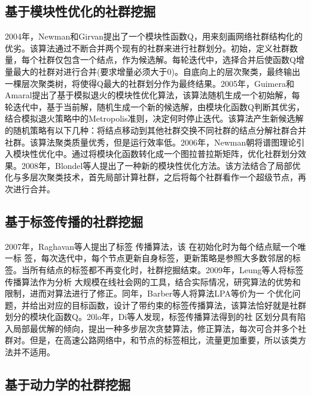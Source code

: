 	\subsection{基于模块性优化的社群挖掘}
		2004年，Newman和Girvan提出了一个模块性函数Q，用来刻画网络社群结构化的优劣\parencite{NewmanFast}。该算法通过不断合并两个现有的社群来进行社群划分。初始，定义社群数量，每个社群仅包含一个结点，作为候选解。每轮迭代中，选择合并后使函数Q增量最大的社群对进行合并(要求增量必须大于0)。自底向上的层次聚类，最终输出一棵层次聚类树，将使得Q最大的社群划分作为最终结果。2005年，Guimera和Amaral提出了基于模拟退火的模块性优化算法\parencite{Guimer2005Functional}，该算法随机生成一个初始解，每轮迭代中，基于当前解，随机生成一个新的候选解，由模块化函数Q判断其优劣，结合模拟退火策略中的Metropolis准则，决定何时停止迭代。该算法产生新候选解的随机策略有以下几种：将结点移动到其他社群交换不同社群的结点分解社群合并社群。该算法聚类质量优秀，但是运行效率低。2006年，Newman朝将谱图理论引入模块性优化中\parencite{Newman2006Modularity}。通过将模块化函数转化成一个图拉普拉斯矩阵，优化社群划分效果。2008年，Blondel等人提出了一种新的模块性优化方法\parencite{Sanyal2006Viscous}。该方法结合了局部优化与多层次聚类技术，首先局部计算社群，之后将每个社群看作一个超级节点，再次进行合并。
	\subsection{基于标签传播的社群挖掘}

2007年，Raghavan等人提出了标签
传播算法\parencite{Raghavan2007Near}，该
在初始化时为每个结点赋一个唯一标
签，每次迭代中，每个节点更新自身标签，更新策略是参照大多数邻居的标签。当所有结点的标签都不再变化时，社群挖掘结束。2009年，Leung等人将标签传播算法作为分析
大规模在线社会网的工具\parencite{Leung2009Towards}，结合实际情况，研究算法的优势和限制，进而对算法进行了修正。同年，Barber等人将算法LPA等价为一
个优化问题，并给出对应的目标函数\parencite{Barber2009Detecting}，设计了带约束的标签传播算法，该算法恰好就是社群划分的模块化函数Q。20lo年，Di等人发现，标签传播算法得到的社
区划分具有陷入局部最优解的倾向\parencite{Di2012Ant}，提出一种多步层次贪婪算法，修正算法，每次可合并多个社群对。但是，在高速公路网络中，和节点的标签相比，流量更加重要，所以该类方法并不适用。

\subsection{基于动力学的社群挖掘}

